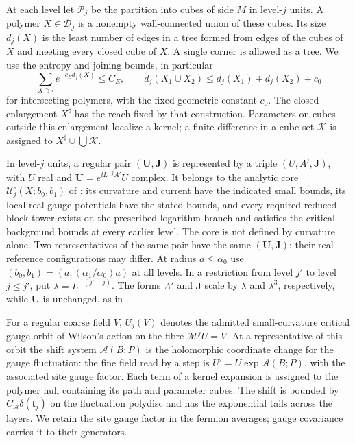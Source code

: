 \documentclass[11pt,letterpaper,reqno]{amsart}
\theoremstyle{definition}
\theoremstyle{remark}
\begin{document}
At each level let $\mathcal P_j$ be the partition into cubes of side
$M$ in level-$j$ units. A polymer $X\in\mathcal D_j$ is a
nonempty wall-connected union of these cubes. Its size $d_j(X)$
is the least number of edges in a tree formed from edges of the
cubes of $X$ and meeting every closed cube of $X$. A single
corner is allowed as a tree. We use the entropy and joining bounds,
in particular
\[
 \sum_{X\ni\square}e^{-c_Ed_j(X)}\le C_E,
 \qquad
 d_j(X_1\cup X_2)\le d_j(X_1)+d_j(X_2)+c_0
\]
for intersecting polymers, with the fixed geometric constant
$c_0$. The closed enlargement $X^\sharp$ has the reach fixed
by that construction. Parameters on cubes outside this
enlargement localize a kernel; a finite difference in a cube
set $\mathcal K$ is assigned to $X^\sharp\cup\bigcup\mathcal K$.

In level-$j$ units, a regular pair $(\mathbf U,\mathbf J)$ is
represented by a triple $(U,A',\mathbf J)$, with $U$ real and
$\mathbf U=e^{iL^{-j}A'}U$ complex. It belongs to
the analytic core $\mathcal U_j^\circ(X;b_0,b_1)$ of
\cite[Definition~49.1]{YMM1}: its curvature and current have the
indicated small bounds, its local real gauge potentials have
the stated bounds, and every required reduced block tower
exists on the prescribed logarithm branch and satisfies the
critical-background bounds at every earlier level.
The core is not defined by curvature alone. Two representatives
of the same pair have the same $(\mathbf U,\mathbf J)$;
their real reference configurations may differ. At radius
$a\le\alpha_0$ use
$(b_0,b_1)=(a,(\alpha_1/\alpha_0)a)$ at all levels.
In a restriction from level $j'$ to level $j\le j'$, put
$\lambda=L^{-(j'-j)}$. The forms $A'$ and $\mathbf J$ scale by
$\lambda$ and $\lambda^3$, respectively, while $\mathbf U$ is
unchanged, as in \cite[Equation~(757)]{YMM1}.

For a regular coarse field $V$, $U_j(V)$ denotes the admitted
small-curvature critical gauge orbit of Wilson's action on
the fibre $\mathcal M^jU=V$. At a representative of this
orbit the shift system $\mathcal A(B;P)$ is the
holomorphic coordinate change for the gauge fluctuation:
the fine field read by a step is
$U'=U\exp\mathcal A(B;P)$, with the associated site gauge
factor. Each term of a kernel expansion is assigned to the
polymer hull containing its path and parameter cubes.
The shift is bounded by
$C_{\mathcal A}\delta(\mathsf t_j)$ on the fluctuation
polydisc and has the exponential tails across
the layers. We retain the site gauge factor in the
fermion averages; gauge covariance carries it to their
generators.
\end{document}
